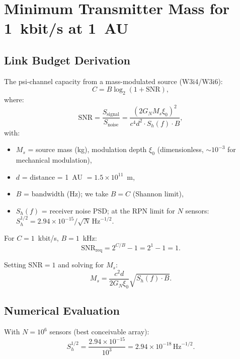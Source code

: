 \documentclass[11pt]{article}
\theoremstyle{definition}
\theoremstyle{remark}
\newcommand{\ee}[1]{\times10^{#1}}
\newcommand{\sqrtHz}{\,\mathrm{Hz}^{-1/2}}
\newcommand{\SNR}{\mathrm{SNR}}
\newcommand{\GN}{G_N}
\begin{document}
\section{Minimum Transmitter Mass for 1~kbit/s at 1~AU}
\label{sec:P8-minimum-mass}

\subsection{Link Budget Derivation}

The psi-channel capacity from a mass-modulated source (W3i4/W3i6):
\begin{equation}
C = B\log_2\!\left(1 + \SNR\right),
\label{eq:capacity}
\end{equation}
where:
\begin{equation}
\SNR = \frac{S_{\mathrm{signal}}}{S_{\mathrm{noise}}}
= \frac{(2\GN M_s \xi_0)^2}{c^4 d^2 \cdot S_h(f) \cdot B},
\label{eq:SNR-link}
\end{equation}
with:
\begin{itemize}[nosep]
\item $M_s$ = source mass (kg), modulation depth $\xi_0$ (dimensionless,
  $\sim 10^{-3}$ for mechanical modulation),
\item $d$ = distance = 1~AU $= 1.5\ee{11}$~m,
\item $B$ = bandwidth (Hz); we take $B = C$ (Shannon limit),
\item $S_h(f)$ = receiver noise PSD; at the RPN limit for $N$ sensors:
  $S_h^{1/2} = 2.94\ee{-15}/\sqrt{N}\sqrtHz$.
\end{itemize}

For $C = 1$~kbit/s, $B = 1$~kHz:
\begin{equation}
\SNR_{\mathrm{req}} = 2^{C/B} - 1 = 2^1 - 1 = 1.
\label{eq:SNR-req}
\end{equation}

Setting $\SNR = 1$ and solving for $M_s$:
\begin{equation}
M_s = \frac{c^2 d}{2\GN \xi_0}
\sqrt{S_h(f) \cdot B}.
\label{eq:M-min}
\end{equation}

\subsection{Numerical Evaluation}

With $N = 10^6$ sensors (best conceivable array):
\begin{equation}
S_h^{1/2} = \frac{2.94\ee{-15}}{10^3} = 2.94\ee{-18}\sqrtHz.
\end{equation}
\end{document}
